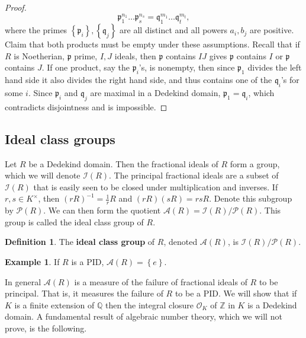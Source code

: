 \documentclass{article}
\newcommand{\Z}{\mathbb{Z}}
\newcommand{\Q}{\mathbb{Q}}
\newcommand{\rb}[1]{\left( #1 \right)}
\newcommand{\cb}[1]{\left\{ #1 \right\}}
\theoremstyle{definition}\newtheorem{definition}{Definition}[subsection]
\theoremstyle{definition}\newtheorem{remark}[definition]{Remark}
\theoremstyle{definition}\newtheorem*{example}{Example}
\theoremstyle{definition}\newtheorem*{note}{Note}
\begin{document}
\begin{proof}
$$ \mathfrak{p}_1^{n_1} \dots \mathfrak{p}_s^{n_s} = \mathfrak{q}_1^{m_1} \dots \mathfrak{q}_t^{m_t}, $$
where the primes $ \cb{\mathfrak{p}_i}, \cb{\mathfrak{q}_j} $ are all distinct and all powers $ a_i, b_j $ are positive. Claim that both products must be empty under these assumptions. Recall that if $ R $ is Noetherian, $ \mathfrak{p} $ prime, $ I, J $ ideals, then $ \mathfrak{p} $ contains $ IJ $ gives $ \mathfrak{p} $ contains $ I $ or $ \mathfrak{p} $ contains $ J $. If one product, say the $ \mathfrak{p}_i $'s, is nonempty, then since $ \mathfrak{p}_1 $ divides the left hand side it also divides the right hand side, and thus contains one of the $ \mathfrak{q}_i $'s for some $ i $. Since $ \mathfrak{p}_i $ and $ \mathfrak{q}_j $ are maximal in a Dedekind domain, $ \mathfrak{p}_1 = \mathfrak{q}_i $, which contradicts disjointness and is impossible.
\end{proof}

\subsection{Ideal class groups}

Let $ R $ be a Dedekind domain. Then the fractional ideals of $ R $ form a group, which we will denote $ \mathcal{I}\rb{R} $. The principal fractional ideals are a subset of $ \mathcal{I}\rb{R} $ that is easily seen to be closed under multiplication and inverses. If $ r, s \in K^\times $, then $ \rb{rR}^{-1} = \tfrac{1}{r}R $ and $ \rb{rR}\rb{sR} = rsR $. Denote this subgroup by $ \mathcal{P}\rb{R} $. We can then form the quotient $ \mathcal{A}\rb{R} = \mathcal{I}\rb{R} / \mathcal{P}\rb{R} $. This group is called the ideal class group of $ R $.

\begin{definition}
The \textbf{ideal class group} of $ R $, denoted $ \mathcal{A}\rb{R} $, is $ \mathcal{I}\rb{R} / \mathcal{P}\rb{R} $.
\end{definition}

\begin{example}
If $ R $ is a PID, $ \mathcal{A}\rb{R} = \cb{e} $.
\end{example}

In general $ \mathcal{A}\rb{R} $ is a measure of the failure of fractional ideals of $ R $ to be principal. That is, it measures the failure of $ R $ to be a PID. We will show that if $ K $ is a finite extension of $ \Q $ then the integral closure $ \mathcal{O}_K $ of $ \Z $ in $ K $ is a Dedekind domain. A fundamental result of algebraic number theory, which we will not prove, is the following.
\end{document}
